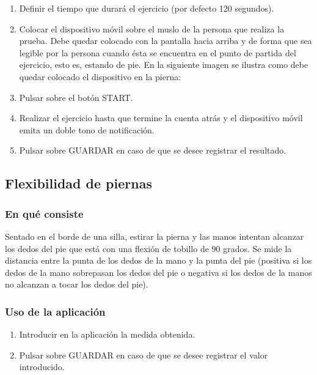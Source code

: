 \begin{enumerate}
\item Definir el tiempo que durará el ejercicio (por defecto 120 segundos). 
\item Colocar el dispositivo móvil sobre el muslo de la persona que realiza la prueba. Debe quedar colocado con la pantalla hacia arriba y de forma que sea legible por la persona cuando ésta se encuentra en el punto de partida del ejercicio, esto es, estando de pie. En la siguiente imagen se ilustra como debe quedar colocado el dispositivo en la pierna:

\item Pulsar sobre el botón START.
\item Realizar el ejercicio hasta que termine la cuenta atrás y el dispositivo móvil emita un doble tono de notificación.
\item Pulsar sobre GUARDAR en caso de que se desee registrar el resultado.
\end{enumerate}

\subsection{Flexibilidad de piernas}

\subsubsection{En qué consiste}

Sentado en el borde de una silla, estirar la pierna y las manos intentan alcanzar los dedos del pie que está con una flexión de tobillo de 90 grados. Se mide la distancia entre la punta de los dedos de la mano y la punta del pie (positiva si los dedos de la mano sobrepasan los dedos del pie o negativa si los dedos de la manos no alcanzan a tocar los dedos del pie).

\subsubsection{Uso de la aplicación}

\begin{enumerate}
\item Introducir en la aplicación la medida obtenida.
\item Pulsar sobre GUARDAR en caso de que se desee registrar el valor introducido.
\end{enumerate}

